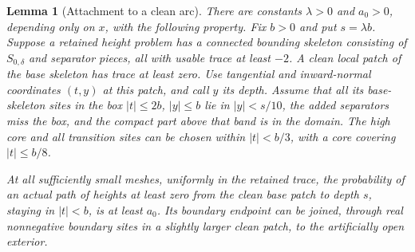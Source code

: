 \documentclass[11pt]{article}
\newtheorem{lemma}[theorem]{Lemma}
\theoremstyle{definition}
\theoremstyle{remark}
\numberwithin{equation}{section}
\begin{document}
\begin{lemma}[Attachment to a clean arc]\label{lem:boundary-attachment}
There are constants $\lambda>0$ and $a_0>0$, depending only on $x$,
with the following property.  Fix $b>0$ and put $s=\lambda b$.
Suppose a retained height problem has a connected bounding skeleton
consisting of $S_{0,\delta}$ and separator pieces, all with usable
trace at least $-2$.  A clean local patch of the base skeleton has
trace at least zero.  Use tangential and inward-normal coordinates
$(t,y)$ at this patch, and call $y$ its depth.  Assume that all its
base-skeleton sites in the box $|t|\le 2b$, $|y|\le b$ lie in
$|y|<s/10$, the added separators miss the box, and the compact part
above that band is in the domain.  The high core and all transition
sites can be chosen within $|t|<b/3$, with a core covering $|t|\le b/8$.

At all sufficiently small meshes, uniformly in the retained trace,
the probability of an actual
path of heights at least zero from the clean base patch to depth
$s$, staying in $|t|<b$, is at least $a_0$.  Its boundary endpoint
can be joined, through real nonnegative boundary sites in a slightly
larger clean patch, to the artificially open exterior.
\end{lemma}
\end{document}
